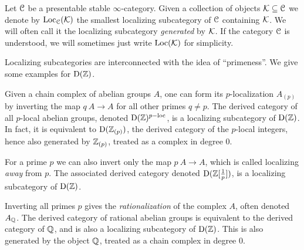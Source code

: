 \begin{definition}
    Let $\EuScript{C}$ be a presentable stable $\infty$-category. Given a collection of objects $\mathcal{K}\subseteq \EuScript{C}$ we denote by $\operatorname{Loc}_{\EuScript{C}}(\mathcal{K})$ the smallest localizing subcategory of $\EuScript{C}$ containing $\mathcal{K}$. We will often call it the localizing subcategory \emph{generated} by $\mathcal{K}$. If the category $\EuScript{C}$ is understood, we will sometimes just write $\operatorname{Loc}(\mathcal{K})$ for simplicity.
\end{definition}

Localizing subcategories are interconnected with the idea of ``primeness''. We give some examples for $\mathrm{D}(\mathbb{Z})$. 

\begin{example}
    \label{ch0:ex:p-local-ab}
    Given a chain complex of abelian groups $A$, one can form its $p$-localization $A_{(p)}$ by inverting the map $q\: A\to A$ for all other primes $q\neq p$. The derived category of all $p$-local abelian groups, denoted $\mathrm{D}(\mathbb{Z})^{p-\mathrm{loc}}$, is a localizing subcategory of $\mathrm{D}(\mathbb{Z})$. In fact, it is equivalent to $\mathrm{D}(\mathbb{Z}_{(p)})$, the derived category of the $p$-local integers, hence also generated by $\mathbb{Z}_{(p)}$, treated as a complex in degree $0$. 
\end{example}

\begin{example}
    \label{ch0:ex:localizing-away-from-p}
    For a prime $p$ we can also invert only the map $p\: A\to A$, which is called localizing \emph{away} from $p$. The associated derived category denoted $\mathrm{D}(\mathbb{Z}[\frac{1}{p}])$, is a localizing subcategory of $\mathrm{D}(\mathbb{Z})$. 
\end{example}

\begin{example}
    \label{ch0:ex:rational-ab}
    Inverting all primes $p$ gives the \emph{rationalization} of the complex $A$, often denoted $A_{\mathbb{Q}}$. The derived category of rational abelian groups is equivalent to the derived category of $\mathbb{Q}$, and is also a localizing subcategory of $\mathrm{D}(\mathbb{Z})$. This is also generated by the object $\mathbb{Q}$, treated as a chain complex in degree $0$. 
\end{example}


